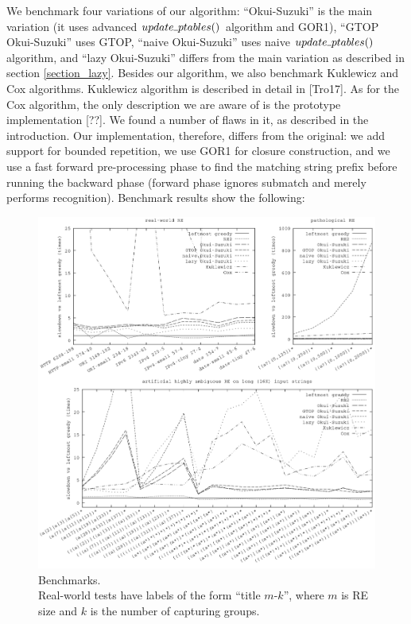 \documentclass[AMA,STIX1COL]{WileyNJD-v2}
\newcommand{\Xund}{\rule{.4em}{.4pt}}
\begin{document}
We benchmark four variations of our algorithm:
``Okui-Suzuki'' is the main variation (it uses advanced $update \Xund ptables ()$ algorithm and GOR1),
``GTOP Okui-Suzuki'' uses GTOP,
``naive Okui-Suzuki'' uses naive $update \Xund ptables ()$ algorithm,
and ``lazy Okui-Suzuki'' differs from the main variation as described in section \ref{section_lazy}.
%
Besides our algorithm, we also benchmark Kuklewicz and Cox algorithms. %
Kuklewicz algorithm is described in detail in [Tro17].
As for the Cox algorithm, the only description we are aware of is the prototype implementation [??].
We found a number of flaws in it, as described in the introduction.
Our implementation, therefore, differs from the original:
we add support for bounded repetition,
we use GOR1 for closure construction,
and we use a fast forward pre-processing phase to find the matching string prefix before running the backward phase
(forward phase ignores submatch and merely performs recognition).
%
Benchmark results show the following:
\\[-0.5em]

\begin{figure}\label{fig_mark_enum}
\includegraphics[width=\linewidth]{img/bench/plot.png}
\vspace{-2em}
\caption{
Benchmarks.\\
Real-world tests have labels of the form ``title $m$-$k$'', where $m$ is RE size and $k$ is the number of capturing groups.
}
\end{figure}
\end{document}
